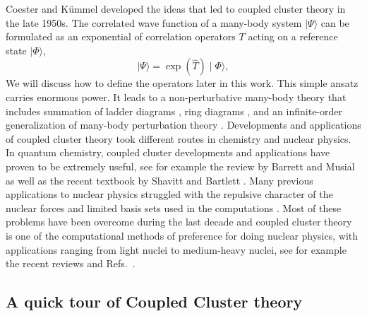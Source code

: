 Coester and K\"{u}mmel \cite{coester1958,coester1960,kuemmel1978} developed the ideas that led to coupled cluster
theory in the late 1950s. The correlated wave function
of a many-body system $\mid\Psi\rangle$
can be formulated as an exponential of correlation
operators $T$ acting on a reference state $\mid\Phi\rangle$,
\begin{equation}
\mid\Psi\rangle = \exp\left(\hat{T}\right)\mid\Phi\rangle,
\end{equation}
We will discuss how to define the operators later in this work. This simple
ansatz carries enormous power. It leads to a non-perturbative many-body
theory that includes summation of ladder diagrams \cite{brueckner1955}, ring
diagrams \cite{brandow1967}, and an infinite-order
generalization of many-body perturbation theory
\cite{bartlett1981}.
Developments and applications of coupled cluster theory took
different routes in chemistry and nuclear physics. In quantum
chemistry, coupled cluster developments and applications have proven
to be extremely useful, see for example the review by Barrett and
Musial as well as the recent textbook by Shavitt and Bartlett \cite{shavittbartlett2009}.
Many previous applications to nuclear physics struggled with the
repulsive character of the nuclear forces and limited basis sets
used in the computations \cite{kuemmel1978}. Most of these problems have been overcome
during the last decade and coupled cluster theory is one of the
computational methods of preference for doing nuclear physics, with
  applications ranging from light nuclei to medium-heavy nuclei, see
  for example the recent reviews \cite{Hagen:2015yea,hagen2016} and 
Refs.~\cite{binder2013,jansen2016}. 


\subsection{A quick tour of Coupled Cluster theory}

